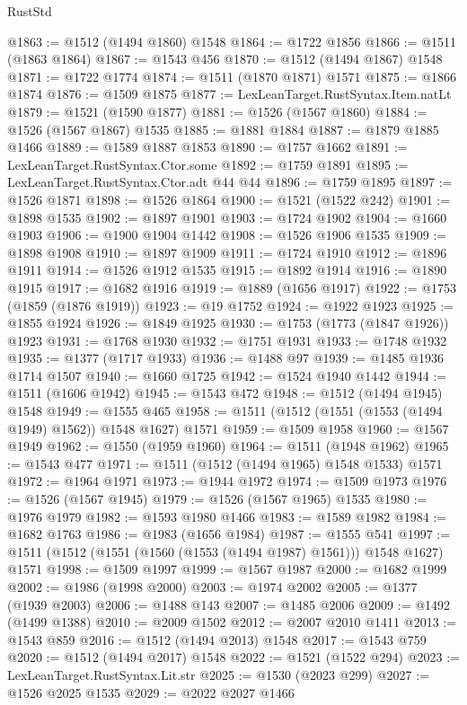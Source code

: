 \begin{lexlean}{RustStd}
\begin{coremodule}
{{@1863 := @1512 (@1494 @1860) @1548
@1864 := @1722 @1856
@1866 := @1511 (@1863 @1864)
@1867 := @1543 @456
@1870 := @1512 (@1494 @1867) @1548
@1871 := @1722 @1774
@1874 := @1511 (@1870 @1871) @1571
@1875 := @1866 @1874
@1876 := @1509 @1875
@1877 := LexLeanTarget.RustSyntax.Item.natLt
@1879 := @1521 (@1590 @1877)
@1881 := @1526 (@1567 @1860)
@1884 := @1526 (@1567 @1867) @1535
@1885 := @1881 @1884
@1887 := @1879 @1885 @1466
@1889 := @1589 @1887 @1853
@1890 := @1757 @1662
@1891 := LexLeanTarget.RustSyntax.Ctor.some
@1892 := @1759 @1891
@1895 := LexLeanTarget.RustSyntax.Ctor.adt @44 @44
@1896 := @1759 @1895
@1897 := @1526 @1871
@1898 := @1526 @1864
@1900 := @1521 (@1522 @242)
@1901 := @1898 @1535
@1902 := @1897 @1901
@1903 := @1724 @1902
@1904 := @1660 @1903
@1906 := @1900 @1904 @1442
@1908 := @1526 @1906 @1535
@1909 := @1898 @1908
@1910 := @1897 @1909
@1911 := @1724 @1910
@1912 := @1896 @1911
@1914 := @1526 @1912 @1535
@1915 := @1892 @1914
@1916 := @1890 @1915
@1917 := @1682 @1916
@1919 := @1889 (@1656 @1917)
@1922 := @1753 (@1859 (@1876 @1919))
@1923 := @19 @1752
@1924 := @1922 @1923
@1925 := @1855 @1924
@1926 := @1849 @1925
@1930 := @1753 (@1773 (@1847 @1926)) @1923
@1931 := @1768 @1930
@1932 := @1751 @1931
@1933 := @1748 @1932
@1935 := @1377 (@1717 @1933)
@1936 := @1488 @97
@1939 := @1485 @1936 @1714 @1507
@1940 := @1660 @1725
@1942 := @1524 @1940 @1442
@1944 := @1511 (@1606 @1942)
@1945 := @1543 @472
@1948 := @1512 (@1494 @1945) @1548
@1949 := @1555 @465
@1958 := @1511 (@1512 (@1551 (@1553 (@1494 @1949) @1562)) @1548 @1627) @1571
@1959 := @1509 @1958
@1960 := @1567 @1949
@1962 := @1550 (@1959 @1960)
@1964 := @1511 (@1948 @1962)
@1965 := @1543 @477
@1971 := @1511 (@1512 (@1494 @1965) @1548 @1533) @1571
@1972 := @1964 @1971
@1973 := @1944 @1972
@1974 := @1509 @1973
@1976 := @1526 (@1567 @1945)
@1979 := @1526 (@1567 @1965) @1535
@1980 := @1976 @1979
@1982 := @1593 @1980 @1466
@1983 := @1589 @1982
@1984 := @1682 @1763
@1986 := @1983 (@1656 @1984)
@1987 := @1555 @541
@1997 := @1511 (@1512 (@1551 (@1560 (@1553 (@1494 @1987) @1561))) @1548 @1627) @1571
@1998 := @1509 @1997
@1999 := @1567 @1987
@2000 := @1682 @1999
@2002 := @1986 (@1998 @2000)
@2003 := @1974 @2002
@2005 := @1377 (@1939 @2003)
@2006 := @1488 @143
@2007 := @1485 @2006
@2009 := @1492 (@1499 @1388)
@2010 := @2009 @1502
@2012 := @2007 @2010 @1411
@2013 := @1543 @859
@2016 := @1512 (@1494 @2013) @1548
@2017 := @1543 @759
@2020 := @1512 (@1494 @2017) @1548
@2022 := @1521 (@1522 @294)
@2023 := LexLeanTarget.RustSyntax.Lit.str
@2025 := @1530 (@2023 @299)
@2027 := @1526 @2025 @1535
@2029 := @2022 @2027 @1466
}}
\end{coremodule}
\end{lexlean}

